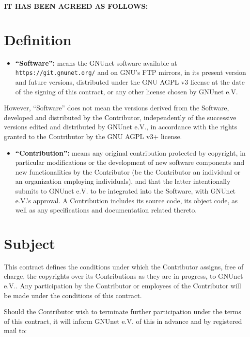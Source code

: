 \documentclass[a4paper]{article} %
\begin{document}
\noindent
{\bf IT HAS BEEN AGREED AS FOLLOWS:}

\section{Definition}

\begin{itemize}
  \item {\bf ``Software'':} means the GNUnet software available at
    {\tt https://git.gnunet.org/} and on GNU's FTP mirrors, in its
    present version and future versions, distributed under the GNU AGPL
    v3 license at the date of the signing of this contract, or any
    other license chosen by GNUnet e.V.
\end{itemize}

However, ``Software'' does not mean the versions derived from the
Software, developed and distributed by the Contributor, independently
of the successive versions edited and distributed by GNUnet e.V., in
accordance with the rights granted to the Contributor by the GNU AGPL
v3+ license.

\begin{itemize}
  \item {\bf ``Contribution'':} means any original contribution
    protected by copyright, in particular modifications or the
    development of new software components and new functionalities by
    the Contributor (be the Contributor an individual or an
    organization employing individuals), and that the latter
    intentionally submits to GNUnet e.V. to be integrated into the
    Software, with GNUnet e.V.'s approval. A Contribution includes its
    source code, its object code, as well as any specifications and
    documentation related thereto.
\end{itemize}

\section{Subject}

This contract defines the conditions under which the Contributor
assigns, free of charge, the copyrights over its Contributions as they
are in progress, to GNUnet e.V..  Any participation by the Contributor
or employees of the Contributor will be made under the conditions of
this contract.

Should the Contributor wish to terminate further participation under
the terms of this contract, it will inform GNUnet e.V. of this in
advance and by registered mail to:
\end{document}
